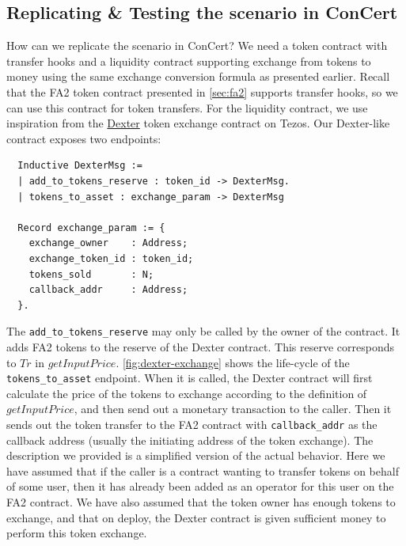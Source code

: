 \documentclass[twoside,11pt,openright]{report}
\newenvironment{code}{\captionsetup{type=figure, singlelinecheck=off, justification=raggedleft}}{}
\newcommand{\coq}[1]{\texttt{#1}}
\begin{document}
\subsection{Replicating \& Testing the scenario in ConCert}
How can we replicate the scenario in ConCert? We need a token contract with transfer hooks and a liquidity contract supporting exchange from tokens to money using the same exchange conversion formula as presented earlier. Recall that the FA2 token contract presented in \autoref{sec:fa2} supports transfer hooks, so we can use this contract for token transfers. For the liquidity contract, we use inspiration from the \href{https://gitlab.com/camlcase-dev/dexter/-/blob/master/dexter-contracts-ligo/dexter.ligo}{Dexter} token exchange contract on Tezos. Our Dexter-like contract exposes two endpoints:
\begin{code}
\begin{verbatim}
  Inductive DexterMsg :=
  | add_to_tokens_reserve : token_id -> DexterMsg.
  | tokens_to_asset : exchange_param -> DexterMsg
  
  Record exchange_param := {
    exchange_owner    : Address;
    exchange_token_id : token_id;
    tokens_sold       : N;
    callback_addr     : Address;
  }.
\end{verbatim}
\end{code}
The \coq{add\_to\_tokens\_reserve} may only be called by the owner of the contract. It adds FA2 tokens to the reserve of the Dexter contract. This reserve corresponds to $Tr$ in $getInputPrice$. \autoref{fig:dexter-exchange} shows the life-cycle of the \coq{tokens\_to\_asset} endpoint. When it is called, the Dexter contract will first calculate the price of the tokens to exchange according to the definition of $getInputPrice$, and then send out a monetary transaction to the caller. Then it sends out the token transfer to the FA2 contract with \coq{callback\_addr} as the callback address (usually the initiating address of the token exchange). The description we provided is a simplified version of the actual behavior. Here we have assumed that if the caller is a contract wanting to transfer tokens on behalf of some user, then it has already been added as an operator for this user on the FA2 contract. We have also assumed that the token owner has enough tokens to exchange, and that on deploy, the Dexter contract is given sufficient money to perform this token exchange.
\end{document}
